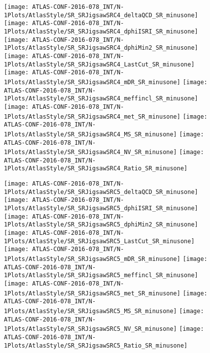 \begin{figure}[tbph]
\begin{center}
\texttt{[image: ATLAS-CONF-2016-078\_INT/N-1Plots/AtlasStyle/SR\_SRJigsawSRC4\_deltaQCD\_SR\_minusone]}
\texttt{[image: ATLAS-CONF-2016-078\_INT/N-1Plots/AtlasStyle/SR\_SRJigsawSRC4\_dphiISRI\_SR\_minusone]}
\texttt{[image: ATLAS-CONF-2016-078\_INT/N-1Plots/AtlasStyle/SR\_SRJigsawSRC4\_dphiMin2\_SR\_minusone]}
\texttt{[image: ATLAS-CONF-2016-078\_INT/N-1Plots/AtlasStyle/SR\_SRJigsawSRC4\_LastCut\_SR\_minusone]}
\texttt{[image: ATLAS-CONF-2016-078\_INT/N-1Plots/AtlasStyle/SR\_SRJigsawSRC4\_mDR\_SR\_minusone]}
\texttt{[image: ATLAS-CONF-2016-078\_INT/N-1Plots/AtlasStyle/SR\_SRJigsawSRC4\_meffincl\_SR\_minusone]}
\texttt{[image: ATLAS-CONF-2016-078\_INT/N-1Plots/AtlasStyle/SR\_SRJigsawSRC4\_met\_SR\_minusone]}
\texttt{[image: ATLAS-CONF-2016-078\_INT/N-1Plots/AtlasStyle/SR\_SRJigsawSRC4\_MS\_SR\_minusone]}
\texttt{[image: ATLAS-CONF-2016-078\_INT/N-1Plots/AtlasStyle/SR\_SRJigsawSRC4\_NV\_SR\_minusone]}
\texttt{[image: ATLAS-CONF-2016-078\_INT/N-1Plots/AtlasStyle/SR\_SRJigsawSRC4\_Ratio\_SR\_minusone]}
\end{center}
\caption{}
\label{fig:SR_SRJigsawSRC4_deltaQCD_SR_minusone}
\end{figure}

\clearpage
\begin{figure}[tbph]
\begin{center}
\texttt{[image: ATLAS-CONF-2016-078\_INT/N-1Plots/AtlasStyle/SR\_SRJigsawSRC5\_deltaQCD\_SR\_minusone]}
\texttt{[image: ATLAS-CONF-2016-078\_INT/N-1Plots/AtlasStyle/SR\_SRJigsawSRC5\_dphiISRI\_SR\_minusone]}
\texttt{[image: ATLAS-CONF-2016-078\_INT/N-1Plots/AtlasStyle/SR\_SRJigsawSRC5\_dphiMin2\_SR\_minusone]}
\texttt{[image: ATLAS-CONF-2016-078\_INT/N-1Plots/AtlasStyle/SR\_SRJigsawSRC5\_LastCut\_SR\_minusone]}
\texttt{[image: ATLAS-CONF-2016-078\_INT/N-1Plots/AtlasStyle/SR\_SRJigsawSRC5\_mDR\_SR\_minusone]}
\texttt{[image: ATLAS-CONF-2016-078\_INT/N-1Plots/AtlasStyle/SR\_SRJigsawSRC5\_meffincl\_SR\_minusone]}
\texttt{[image: ATLAS-CONF-2016-078\_INT/N-1Plots/AtlasStyle/SR\_SRJigsawSRC5\_met\_SR\_minusone]}
\texttt{[image: ATLAS-CONF-2016-078\_INT/N-1Plots/AtlasStyle/SR\_SRJigsawSRC5\_MS\_SR\_minusone]}
\texttt{[image: ATLAS-CONF-2016-078\_INT/N-1Plots/AtlasStyle/SR\_SRJigsawSRC5\_NV\_SR\_minusone]}
\texttt{[image: ATLAS-CONF-2016-078\_INT/N-1Plots/AtlasStyle/SR\_SRJigsawSRC5\_Ratio\_SR\_minusone]}
\end{center}
\caption{}
\label{fig:SR_SRJigsawSRC5_dphiMin2_SR_minusone}
\end{figure}

